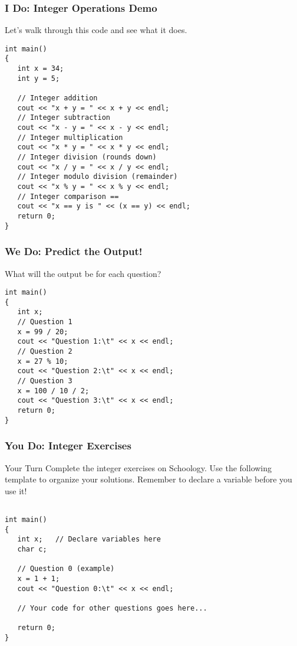 \documentclass{beamer}
\begin{document}
\begin{frame}[fragile]
\frametitle{I Do: Integer Operations Demo}
Let's walk through this code and see what it does.\pause
\begin{verbatim}
int main()
{
   int x = 34;
   int y = 5;

   // Integer addition
   cout << "x + y = " << x + y << endl;
   // Integer subtraction
   cout << "x - y = " << x - y << endl;
   // Integer multiplication
   cout << "x * y = " << x * y << endl;
   // Integer division (rounds down)
   cout << "x / y = " << x / y << endl;
   // Integer modulo division (remainder)
   cout << "x % y = " << x % y << endl;
   // Integer comparison ==
   cout << "x == y is " << (x == y) << endl;
   return 0;
}
\end{verbatim}
\end{frame}

\begin{frame}[fragile]
\frametitle{We Do: Predict the Output!}
What will the output be for each question?\pause
\begin{verbatim}
int main()
{
   int x;
   // Question 1
   x = 99 / 20;
   cout << "Question 1:\t" << x << endl;
   // Question 2
   x = 27 % 10;
   cout << "Question 2:\t" << x << endl;
   // Question 3
   x = 100 / 10 / 2;
   cout << "Question 3:\t" << x << endl;
   return 0;
}
\end{verbatim}
\end{frame}

\begin{frame}[fragile]
\frametitle{You Do: Integer Exercises}
\begin{block}{Your Turn}
Complete the integer exercises on Schoology. Use the following template to organize your solutions. Remember to declare a variable before you use it!
\end{block}
\begin{verbatim}

int main()
{
   int x;   // Declare variables here
   char c;

   // Question 0 (example)
   x = 1 + 1;
   cout << "Question 0:\t" << x << endl;

   // Your code for other questions goes here...

   return 0;
}
\end{verbatim}
\end{frame}
\end{document}
